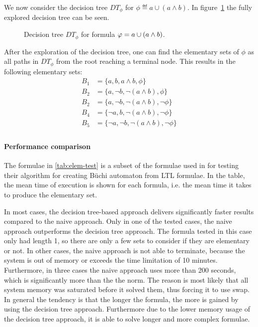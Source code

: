 \begin{example}
We now consider the decision tree $DT_\phi$ for $\phi \eqdef a \cup (a \land b)$. In figure~\ref{fig:elemset} the fully explored decision tree can be seen.

\begin{figure}[!ht]
\begin{center}
    
    \caption{Decision tree $DT_\phi$ for formula $\varphi = a \cup (a \land b)$.}
    \label{fig:elemset}
\end{center}
\end{figure}

After the exploration of the decision tree, one can find the elementary sets of $\phi$ as all paths in $DT_\phi$ from the root reaching a terminal node. This results in the following elementary sets:
\begin{align*}
    B_1 &= \{a,         b,         a\land b,           \phi\} \\
    B_2 &= \{a,         \lnot b,    \lnot (a\land b),   \phi\} \\
    B_2 &= \{a,         \lnot b,    \lnot (a\land b),   \lnot \phi\} \\
    B_4 &= \{\lnot a,   b,         \lnot (a\land b),  \lnot \phi\} \\
    B_5 &= \{\lnot a,   \lnot b,    \lnot (a\land b),   \lnot \phi\} \\
\end{align*}
\end{example}

\paragraph{Performance comparison}
The formulae in \autoref{tab:elem-test} is a subset of the formulae used in \cite[Tab.~1]{somenzi2000efficient} for testing their algorithm for creating Büchi automaton from LTL formulae. In the table, the mean time of execution is shown for each formula, i.e. the mean time it takes to produce the elementary set.



In most cases, the decision tree-based approach delivers significantly faster results compared to the naive approach. Only in one of the tested cases, the naive approach outperforms the decision tree approach. The formula tested in this case only had length 1, so there are only a few sets to consider if they are elementary or not. In other cases, the naive approach is not able to terminate, because the system is out of memory or exceeds the time limitation of 10 minutes. Furthermore, in three cases the naive approach uses more than 200 seconds, which is significantly more than the the norm. The reason is most likely that all system memory was saturated before it solved them, thus forcing it to use swap. In general the tendency is that the longer the formula, the more is gained by using the decision tree approach. Furthermore due to the lower memory usage of the decision tree approach, it is able to solve longer and more complex formulae.

